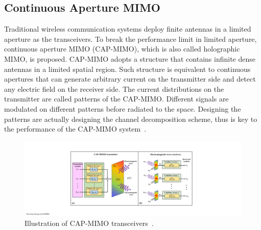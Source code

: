 \documentclass[journal,twocolumn]{IEEEtran}
\begin{document}

\subsection{Continuous Aperture MIMO}
Traditional wireless communication systems deploy finite antennas in a limited aperture as the transceivers. To break the performance limit in limited aperture, continuous aperture MIMO (CAP-MIMO), which is also called holographic MIMO, is proposed. CAP-MIMO adopts a structure that contains infinite dense antennas in a limited spatial region. Such structure is equivalent to continuous apertures that can generate arbitrary current on the transmitter side and detect any electric field on the receiver side. The current distributions on the transmitter are called patterns of the CAP-MIMO. Different signals are modulated on different patterns before  radiated to the space. Designing the patterns are actually designing the channel decomposition scheme, thus is key to the performance of the CAP-MIMO system~\cite{zhang2022pdma}.

\begin{figure}
	\centering 
	\includegraphics[width=0.9\linewidth]{figures/CAPMIMO.pdf} 
	\caption{Illustration of CAP-MIMO transceivers~\cite{zhang2022pdma}.  }
	\label{fig:CAPMIMO}
\end{figure}
\end{document}
